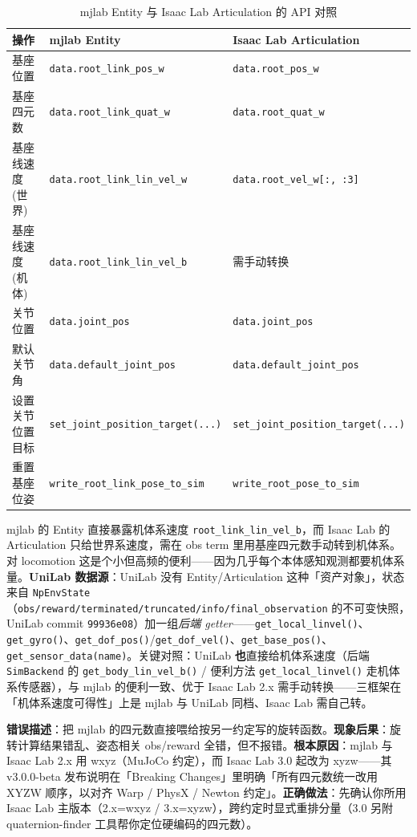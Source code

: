 \begin{table}[ht]
\centering
\caption{mjlab Entity 与 Isaac Lab Articulation 的 API 对照}
\label{tab:rlmc-mgr-entityapi}
\small
\begin{tabular}{@{}lll@{}}
\toprule
操作 & mjlab Entity & Isaac Lab Articulation \\
\midrule
基座位置 & \verb|data.root_link_pos_w| & \verb|data.root_pos_w| \\
基座四元数 & \verb|data.root_link_quat_w| & \verb|data.root_quat_w| \\
基座线速度(世界) & \verb|data.root_link_lin_vel_w| & \verb|data.root_vel_w[:, :3]| \\
基座线速度(机体) & \verb|data.root_link_lin_vel_b| & 需手动转换 \\
关节位置 & \verb|data.joint_pos| & \verb|data.joint_pos| \\
默认关节角 & \verb|data.default_joint_pos| & \verb|data.default_joint_pos| \\
设置关节位置目标 & \verb|set_joint_position_target(...)| & \verb|set_joint_position_target(...)| \\
重置基座位姿 & \verb|write_root_link_pose_to_sim| & \verb|write_root_pose_to_sim| \\
\bottomrule
\end{tabular}
\end{table}

\begin{insight}\label{ins:rlmc-mgr-bodyframe}
mjlab 的 Entity 直接暴露机体系速度 \verb|root_link_lin_vel_b|，而 Isaac Lab 的 Articulation 只给世界系速度，需在 obs term 里用基座四元数手动转到机体系。对 locomotion 这是个小但高频的便利——因为几乎每个本体感知观测都要机体系量。\textbf{UniLab 数据源}：UniLab 没有 Entity/Articulation 这种「资产对象」，状态来自 \verb|NpEnvState|（\verb|obs/reward/terminated/truncated/info/final_observation| 的不可变快照，UniLab commit \texttt{99936e08}）加一组\emph{后端 getter}——\verb|get_local_linvel()|、\verb|get_gyro()|、\verb|get_dof_pos()|/\verb|get_dof_vel()|、\verb|get_base_pos()|、\verb|get_sensor_data(name)|。关键对照：UniLab \textbf{也}直接给机体系速度（后端 \verb|SimBackend| 的 \verb|get_body_lin_vel_b()| / 便利方法 \verb|get_local_linvel()| 走机体系传感器），与 mjlab 的便利一致、优于 Isaac Lab 2.x 需手动转换——三框架在「机体系速度可得性」上是 mjlab 与 UniLab 同档、Isaac Lab 需自己转。
\end{insight}

\begin{pitfall}[假设两框架四元数格式相同]
\textbf{错误描述}：把 mjlab 的四元数直接喂给按另一约定写的旋转函数。\textbf{现象后果}：旋转计算结果错乱、姿态相关 obs/reward 全错，但不报错。\textbf{根本原因}：mjlab 与 Isaac Lab 2.x 用 wxyz（MuJoCo 约定），而 Isaac Lab 3.0 起改为 xyzw——其 v3.0.0-beta 发布说明在「Breaking Changes」里明确「所有四元数统一改用 XYZW 顺序，以对齐 Warp / PhysX / Newton 约定」。\textbf{正确做法}：先确认你所用 Isaac Lab 主版本（2.x=wxyz / 3.x=xyzw），跨约定时显式重排分量（3.0 另附 quaternion-finder 工具帮你定位硬编码的四元数）。
\end{pitfall}

